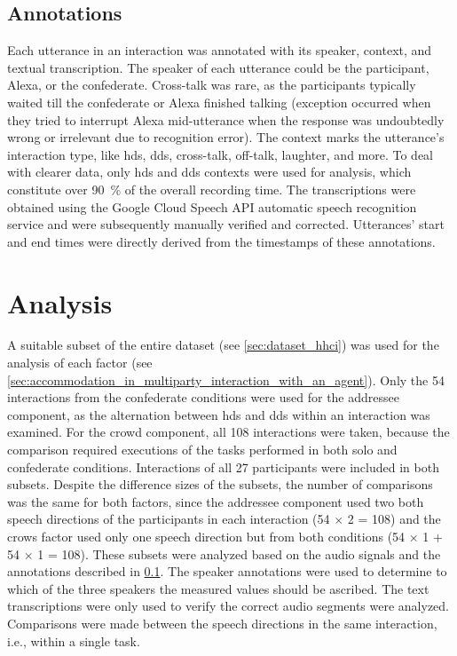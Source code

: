 \subsection{Annotations}
\label{subsec:annotations_hhci}

Each utterance in an interaction was annotated with its speaker, context, and textual transcription.
The speaker of each utterance could be the participant, Alexa, or the confederate.
Cross-talk was rare, as the participants typically waited till the confederate or Alexa finished talking (exception occurred when they tried to interrupt Alexa mid-utterance when the response was undoubtedly wrong or irrelevant due to recognition error).
The context marks the utterance's interaction type, like \ac{hds}, \ac{dds}, cross-talk, off-talk, laughter, and more.
To deal with clearer data, only \ac{hds} and \ac{dds} contexts were used for analysis, which constitute over \SI{90}{\percent} of the overall recording time.
The transcriptions were obtained using the Google Cloud Speech API automatic speech recognition service and were subsequently manually verified and corrected.
Utterances' start and end times were directly derived from the timestamps of these annotations.

\section{Analysis}
\label{sec:analysis_hhci}

A suitable subset of the entire dataset (see \cref{sec:dataset_hhci}) was used for the analysis of each factor (see \cref{sec:accommodation_in_multiparty_interaction_with_an_agent}).
Only the 54 interactions from the confederate conditions were used for the addressee component, as the alternation between \ac{hds} and \ac{dds} within an interaction was examined.
For the crowd component, all 108 interactions were taken, because the comparison required executions of the tasks performed in both solo and confederate conditions.
Interactions of all 27 participants were included in both subsets.
Despite the difference sizes of the subsets, the number of comparisons was the same for both factors, since the addressee component used two both speech directions of the participants in each interaction (54 $\times$ 2 = 108) and the crows factor used only one speech direction but from both conditions (54 $\times$ 1 + 54 $\times$ 1 = 108).
These subsets were analyzed based on the audio signals and the annotations described in \cref{subsec:annotations_hhci}.
The speaker annotations were used to determine to which of the three speakers the measured values should be ascribed.
The text transcriptions were only used to verify the correct audio segments were analyzed.
Comparisons were made between the speech directions in the same interaction, i.e., within a single task.

